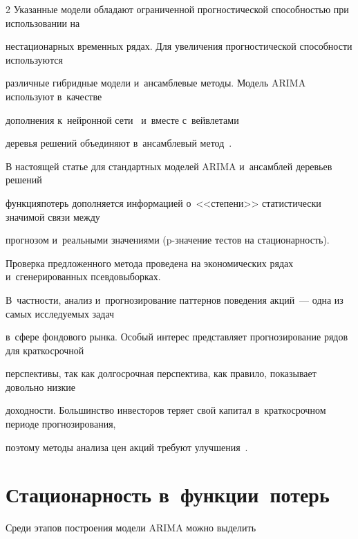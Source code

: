 \begin{multicols}{2}
 Указанные модели обладают ограниченной прогностической спо\-соб\-ностью при использовании на 

 нестационарных временных рядах. Для увеличения прогностической способности используются 

 различные гибридные модели и~ан\-самб\-ле\-вые методы. Модель ARIMA используют в~качестве 

 дополнения к~нейронной сети~\cite{8-kr, 9-kr, 10-kr} и~вместе с~вейвлетами~\cite{11-kr, 12-kr} 

 деревья решений объединяют в~ан\-самб\-ле\-вый метод~\cite{13-kr, 14-kr}.





В настоящей статье для стандартных моделей ARIMA и~ансамблей деревьев решений  

функция\linebreak потерь дополняется информацией о~<<степени>> статистически значимой связи между

 прогнозом и~реальными значениями (p-зна\-че\-ние тес\-тов на ста\-ци\-о\-нар\-ность). 

 Проверка предложенного метода \mbox{проведена} на экономических рядах и~сгенерированных псевдовыборках. 

 В~част\-ности, анализ и~прогнозирование паттернов поведения акций~--- одна из самых исследуемых задач 

 в~сфере фондового рынка. Особый интерес представляет прогнозирование рядов для краткосрочной

  перспективы, так как долгосрочная перспектива, как правило, показывает довольно низкие

   доходности. Большинство инвесторов теряет свой капитал в~краткосрочном периоде прогнозирования, 

   поэтому методы анализа цен акций требуют улучшения~\cite{15-kr}.





\vspace*{-6pt}





\section{Стационарность в~функции~потерь}



 Среди этапов построения модели ARIMA можно выделить 


\end{multicols}
